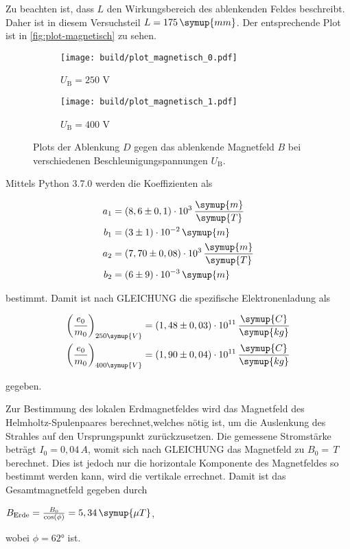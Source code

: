 Zu beachten ist, dass $L$ den Wirkungsbereich des ablenkenden Feldes beschreibt.
Daher ist in diesem Versuchsteil $L = 175 \, \symup{mm}$.
Der entsprechende Plot ist in \autoref{fig:plot-magnetisch} zu sehen.

\begin{figure}
  \centering
  \begin{subfigure}{0.49\textwidth}
    \centering
    \texttt{[image: build/plot\_magnetisch\_0.pdf]}
    \caption{$U_\text{B} = 250$ V}
  \end{subfigure}
  \begin{subfigure}{0.49\textwidth}
    \centering
    \texttt{[image: build/plot\_magnetisch\_1.pdf]}
    \caption{$U_\text{B} = 400$ V}
  \end{subfigure}
  \caption{Plots der Ablenkung $D$ gegen das ablenkende Magnetfeld $B$ bei verschiedenen Beschleunigungspannungen $U_\text{B}$.}
  \label{fig:plot-magnetisch}
\end{figure}

Mittels Python 3.7.0 werden die Koeffizienten als

\begin{align*}
  a_1 &= (8,6 \pm 0,1) \cdot 10^{3} \, \frac{\symup{m}}{\symup{T}} \\
  b_1 &= (3 \pm 1) \cdot 10^{-2} \, \symup{m} \\
  a_2 &= (7,70 \pm 0,08) \cdot 10^{3} \, \frac{\symup{m}}{\symup{T}} \\
  b_2 &= (6 \pm 9) \cdot 10^{-3} \, \symup{m}
\end{align*}

bestimmt.
Damit ist nach GLEICHUNG die spezifische Elektronenladung als 

\begin{align*}
  \bigg( \frac{e_0}{m_0} \bigg)_{250 \symup{V}} &= (1,48 \pm 0,03) \cdot 10^{11} \, \frac{\symup{C}}{\symup{kg}} \\
  \bigg( \frac{e_0}{m_0} \bigg)_{400 \symup{V}} &= (1,90 \pm 0,04) \cdot 10^{11} \, \frac{\symup{C}}{\symup{kg}}
\end{align*}

gegeben.

Zur Bestimmung des lokalen Erdmagnetfeldes wird das Magnetfeld des Helmholtz-Spulenpaares berechnet,welches nötig ist,
um die Auslenkung des Strahles auf den Ursprungspunkt zurückzusetzen.
Die gemessene Stromstärke beträgt $I_0 = 0,04 \, A$, womit sich nach GLEICHUNG das Magnetfeld zu $B_0 = \, T$ berechnet.
Dies ist jedoch nur die horizontale Komponente des Magnetfeldes so bestimmt werden kann, wird die vertikale errechnet.
Damit ist das Gesamtmagnetfeld gegeben durch

\begin{center}
  $B_\text{Erde} = \frac{B_0}{\cos ( \phi )} = 5,34 \, \symup{\mu T}$,
\end{center}

wobei $\phi = 62°$ ist.